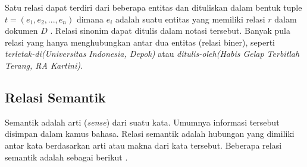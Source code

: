Satu relasi dapat terdiri dari beberapa entitas dan dituliskan dalam bentuk tuple $t = (e_1, e_2, ..., e_n)$ dimana $e_i$ adalah suatu entitas yang memiliki relasi $r$ dalam dokumen $D$ \citep{bach2007review}. Relasi sinonim dapat ditulis dalam notasi tersebut. Banyak pula relasi yang hanya menghubungkan antar dua entitas (relasi biner), seperti \textit{terletak-di(Universitas Indonesia, Depok)} atau \textit{ditulis-oleh(Habis Gelap Terbitlah Terang, RA Kartini)}.

\subsection{Relasi Semantik}
Semantik adalah arti (\textit{sense}) dari suatu kata. Umumnya informasi tersebut disimpan dalam kamus bahasa. Relasi semantik adalah hubungan yang dimiliki antar kata berdasarkan arti atau makna dari kata tersebut. Beberapa relasi semantik adalah sebagai berikut \citep{miller1995wordnet}.
